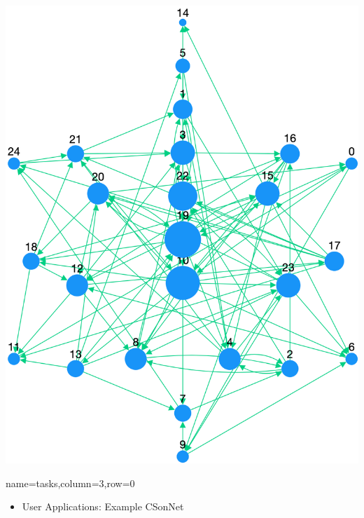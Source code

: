 \documentclass[landscape,paperwidth=70in,paperheight=46in,fontscale=0.225]{baposter} %
\begin{document}
\begin{poster}
{\begin{center}
\includegraphics[scale=0.12]{figures/gnm-25-100.pngraph.png} 
\end{center}
}

          {name=tasks,column=3,row=0}{


\begin{itemize}[leftmargin=*,noitemsep,topsep=0pt]
\item User Applications:  Example CSonNet
\end{itemize}

}
\end{poster}
\end{document}
